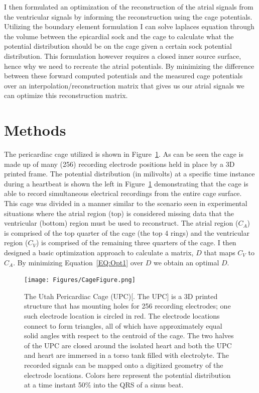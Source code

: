 \documentclass[12pt]{article}
\begin{document}
I then formulated an optimization of the reconstruction of the atrial signals from the ventricular signals by informing the reconstruction using the cage potentials. Utilizing the boundary element formulation I can solve laplaces equation through the volume between the epicardial sock and the cage to calculate what the potential distribution should be on the cage given a certain sock potential distribution. This formulation however requires a closed inner source surface, hence why we need to recreate the atrial potentials. By minimizing the difference between these forward computed potentials and the measured cage potentials over an interpolation/reconstruction matrix that gives us our atrial signals we can optimize this reconstruction matrix.

\section{Methods}

The pericardiac cage utilized is shown in Figure~\ref{Fig:Cag}. As can be seen the cage is made up of many (256) recording electrode positions held in place by a 3D printed frame. The potential distribution (in milivolts) at a specific time instance during a heartbeat is shown the left in Figure~\ref{Fig:Cag} demonstrating that the cage is able to record simultaneous electrical recordings from the entire cage surface. This cage was divided in a manner similar to the scenario seen in experimental situations where the atrial region (top) is considered missing data that the ventricular (bottom) region must be used to reconstruct. The atrial region ($C_A$) is comprised of the top quarter of the cage (the top 4 rings) and the ventricular region ($C_V$) is comprised of the remaining three quarters of the cage. I then designed a basic optimization approach to calculate a matrix, $D$ that maps $C_V$ to $C_A$. By minimizing Equation~\ref{EQ:Opt1} over $D$ we obtain an optimal $D$.

\begin{figure}[h]
	\texttt{[image: Figures/CageFigure.png]}
	\caption{The Utah Pericardiac Cage (UPC)[. The UPC] is a 3D printed
		structure that has mounting holes for 256 recording
		electrodes; one such electrode location is circled in red. The electrode locations connect to form
		triangles, all of which have approximately equal solid
		angles with respect to the centroid of the cage. The two halves of
		the UPC are closed around the isolated heart and both the UPC and
		heart are immersed in a torso tank filled with
		electrolyte. The recorded signals can be mapped onto a digitized
		geometry of the electrode locations. Colors here represent the
		potential distribution at a time instant 50\% into the QRS of a sinus
		beat.}
	\label{Fig:Cag}
\end{figure}
\end{document}
